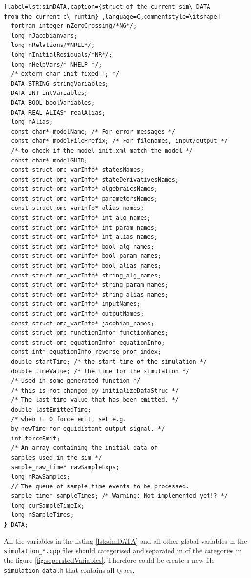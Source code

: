 \begin{lstlisting}[label=lst:simDATA,caption={struct of the current sim\_DATA
from the current c\_runtim} ,language=C,commentstyle=\itshape]
  fortran_integer nZeroCrossing/*NG*/;
  long nJacobianvars;
  long nRelations/*NREL*/;
  long nInitialResiduals/*NR*/;
  long nHelpVars/* NHELP */;
  /* extern char init_fixed[]; */
  DATA_STRING stringVariables;
  DATA_INT intVariables;
  DATA_BOOL boolVariables;
  DATA_REAL_ALIAS* realAlias;
  long nAlias;
  const char* modelName; /* For error messages */
  const char* modelFilePrefix; /* For filenames, input/output */
  /* to check if the model_init.xml match the model */
  const char* modelGUID;
  const struct omc_varInfo* statesNames;
  const struct omc_varInfo* stateDerivativesNames;
  const struct omc_varInfo* algebraicsNames;
  const struct omc_varInfo* parametersNames;
  const struct omc_varInfo* alias_names;
  const struct omc_varInfo* int_alg_names;
  const struct omc_varInfo* int_param_names;
  const struct omc_varInfo* int_alias_names;
  const struct omc_varInfo* bool_alg_names;
  const struct omc_varInfo* bool_param_names;
  const struct omc_varInfo* bool_alias_names;
  const struct omc_varInfo* string_alg_names;
  const struct omc_varInfo* string_param_names;
  const struct omc_varInfo* string_alias_names;
  const struct omc_varInfo* inputNames;
  const struct omc_varInfo* outputNames;
  const struct omc_varInfo* jacobian_names;
  const struct omc_functionInfo* functionNames;
  const struct omc_equationInfo* equationInfo;
  const int* equationInfo_reverse_prof_index;
  double startTime; /* the start time of the simulation */
  double timeValue; /* the time for the simulation */
  /* used in some generated function */
  /* this is not changed by initializeDataStruc */
  /* The last time value that has been emitted. */
  double lastEmittedTime;
  /* when != 0 force emit, set e.g.
  by newTime for equidistant output signal. */
  int forceEmit;
  /* An array containing the initial data of
  samples used in the sim */
  sample_raw_time* rawSampleExps;
  long nRawSamples;
  // The queue of sample time events to be processed.
  sample_time* sampleTimes; /* Warning: Not implemented yet!? */
  long curSampleTimeIx;
  long nSampleTimes;
} DATA;
\end{lstlisting}

All the variables in the listing \ref{lst:simDATA} and all other global
variables in the \verb+simulation_*.cpp+ files should categorised and separated
in of the categories in the figure \ref{fig:seperatedVariables}.
Therefore could be create a new file \verb+simulation_data.h+ that contains all
types.
$~~$\\



